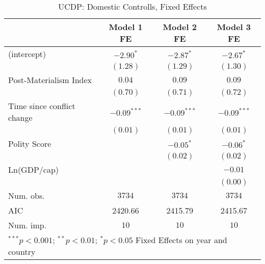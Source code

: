 
\begin{table}
\begin{center}
\begin{tabular}{l c c c}
\toprule
 & Model 1 FE & Model 2 FE & Model 3 FE \\
\midrule
(intercept)                & $-2.90^{*}$   & $-2.87^{*}$   & $-2.67^{*}$   \\
                           & $(1.28)$      & $(1.29)$      & $(1.30)$      \\
Post-Materialism Index     & $0.04$        & $0.09$        & $0.09$        \\
                           & $(0.70)$      & $(0.71)$      & $(0.72)$      \\
Time since conflict change & $-0.09^{***}$ & $-0.09^{***}$ & $-0.09^{***}$ \\
                           & $(0.01)$      & $(0.01)$      & $(0.01)$      \\
Polity Score               &               & $-0.05^{*}$   & $-0.06^{*}$   \\
                           &               & $(0.02)$      & $(0.02)$      \\
Ln(GDP/cap)                &               &               & $-0.01$       \\
                           &               &               & $(0.00)$      \\
\midrule
Num. obs.                  & $3734$        & $3734$        & $3734$        \\
AIC                        & 2420.66       & 2415.79       & 2415.67       \\
Num. imp.                  & $10$          & $10$          & $10$          \\
\bottomrule
\multicolumn{4}{l}{\scriptsize{ $^{***}p<0.001$; $^{**}p<0.01$; $^{*}p<0.05$ 
 Fixed Effects on year and country}}
\end{tabular}
\caption{UCDP: Domestic Controlls, Fixed Effects}
\label{UCDP_1_FE_PM}
\end{center}
\end{table}
